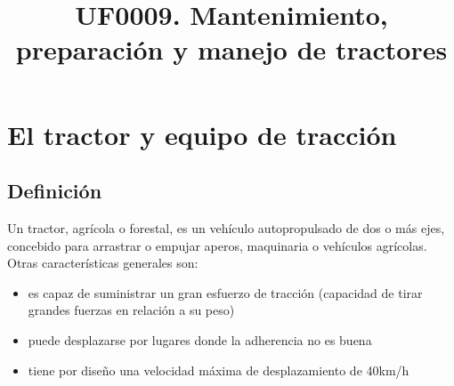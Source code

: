 \documentclass[a4paper,12pt,oneside]{article}
\date{}
\title{UF0009. Mantenimiento, preparación y manejo de tractores}
\begin{document}
\maketitle
\thispagestyle{empty} \tableofcontents \clearpage\section{El tractor y equipo de tracción}
\label{sec:org02bde56}
\subsection{Definición}
\label{sec:org37c4048}
Un tractor, agrícola o forestal, es un vehículo autopropulsado de dos o más
ejes, concebido para arrastrar o empujar aperos, maquinaria o vehículos
agrícolas. 
Otras características generales son:
\begin{itemize}
\item es capaz de suministrar un gran esfuerzo de tracción (capacidad de tirar
grandes fuerzas en relación a su peso)
\item puede desplazarse por lugares donde la adherencia no es buena
\item tiene por diseño una velocidad máxima de desplazamiento de 40km/h
\end{itemize}
\end{document}
